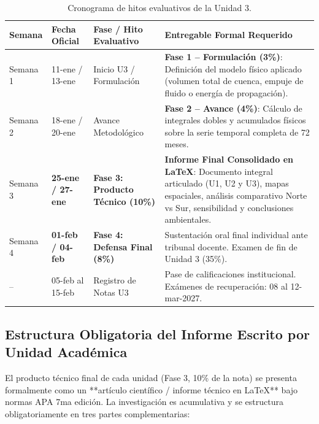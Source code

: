 \documentclass[11pt,a4paper]{article}
\begin{document}
\begin{table}[h!]
\centering
\scriptsize
\renewcommand{\arraystretch}{1.12}
\begin{tabularx}{\textwidth}{C{1.3cm} C{2.4cm} L{3.4cm} Y}
\toprule
\textbf{Semana} & \textbf{Fecha Oficial} & \textbf{Fase / Hito Evaluativo} & \textbf{Entregable Formal Requerido} \\
\midrule
Semana 1 & 11-ene / 13-ene & Inicio U3 / Formulación & \textbf{Fase 1 -- Formulación (3\%)}: Definición del modelo físico aplicado (volumen total de cuenca, empuje de fluido o energía de propagación). \\
Semana 2 & 18-ene / 20-ene & Avance Metodológico & \textbf{Fase 2 -- Avance (4\%)}: Cálculo de integrales dobles y acumulados físicos sobre la serie temporal completa de 72 meses. \\
Semana 3 & \textbf{25-ene / 27-ene} & \textbf{Fase 3: Producto Técnico (10\%)} & \textbf{Informe Final Consolidado en \LaTeX{}}: Documento integral articulado (U1, U2 y U3), mapas espaciales, análisis comparativo Norte vs Sur, sensibilidad y conclusiones ambientales. \\
Semana 4 & \textbf{01-feb / 04-feb} & \textbf{Fase 4: Defensa Final (8\%)} & Sustentación oral final individual ante tribunal docente. Examen de fin de Unidad 3 (35\%). \\
-- & 05-feb al 15-feb & Registro de Notas U3 & Pase de calificaciones institucional. Exámenes de recuperación: 08 al 12-mar-2027. \\
\bottomrule
\end{tabularx}
\caption{Cronograma de hitos evaluativos de la Unidad 3.}
\end{table}

\subsection{Estructura Obligatoria del Informe Escrito por Unidad Académica}

El producto técnico final de cada unidad (Fase 3, 10\% de la nota) se presenta formalmente como un **artículo científico / informe técnico en \LaTeX{}** bajo normas APA 7ma edición. La investigación es acumulativa y se estructura obligatoriamente en tres partes complementarias:
\end{document}
